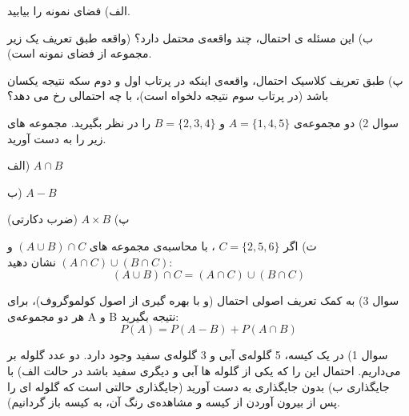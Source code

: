 \documentclass[10pt,letterpaper]{article}
\newcommand{\pic}[2]{
\begin{center}
\texttt{[image: \#1]}
\end{center}
}
\newcommand{\eqn}[1]{
\[\begin{split}
#1
\end{split}\]
}
\begin{document}
الف) فضای نمونه را بیابید.

ب) این مسئله ی احتمال، چند واقعه‌ی محتمل دارد؟ (واقعه طبق تعریف یک زیر مجموعه از فضای نمونه است).

پ) طبق تعریف کلاسیک احتمال، واقعه‌ی اینکه در پرتاب اول و دوم سکه نتیجه یکسان باشد (در پرتاب سوم نتیجه دلخواه است)، با چه احتمالی رخ می دهد؟

سوال 2) دو مجموعه‌ی 
$
A=\{1,4,5\}
$
و
$
B=\{2,3,4\}
$
 را در نظر بگیرید. مجموعه های زیر را به دست آورید.

الف) 
$
A\cap B
$

ب)
$
A-B
$

پ)
$
A\times B
$
 (ضرب دکارتی)

ت) اگر 
$
C=\{2,5,6\}
$
، با محاسبه‌ی مجموعه های 
$
(A\cup B)\cap C
$
و
$
(A\cap C)\cup (B\cap C)
$
نشان دهید:
$$
(A\cup B)\cap C=(A\cap C)\cup (B\cap C)
$$

سوال 3) به کمک تعریف اصولی احتمال (و با بهره گیری از اصول کولموگروف)، برای هر دو مجموعه‌ی A و B نتیجه بگیرید:
$$
P(A)=P(A-B)+P(A\cap B)
$$
%
%
%
%
%

سوال 1) در یک کیسه، 5 گلوله‌ی آبی و 3 گلوله‌ی سفید وجود دارد. دو عدد گلوله بر می‌داریم. احتمال این را که یکی از گلوله ها آبی و دیگری سفید باشد در حالت
\newline
الف) با جایگذاری
\newline
ب) بدون جایگذاری
\newline
به دست آورید (جایگذاری حالتی است که گلوله ای را پس از بیرون آوردن از کیسه و مشاهده‌ی رنگ آن، به کیسه باز گردانیم).
\end{document}
